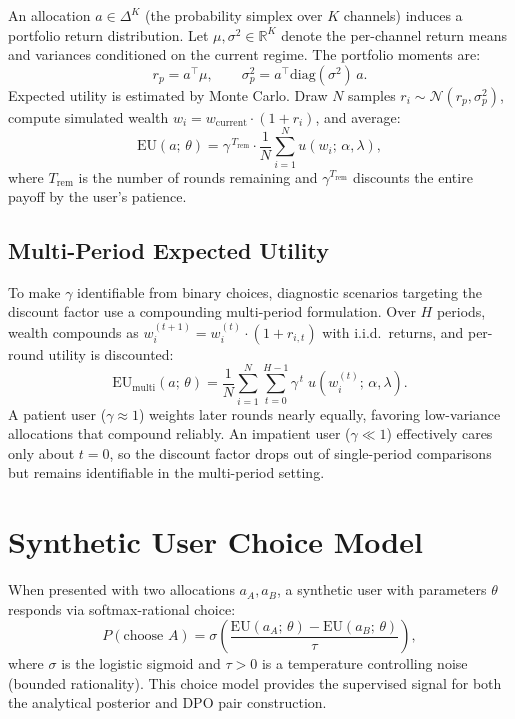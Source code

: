 \documentclass[11pt]{article}
\begin{document}
An allocation $a \in \Delta^K$ (the probability simplex over $K$ channels)
induces a portfolio return distribution. Let $\mu, \sigma^2 \in \mathbb{R}^K$
denote the per-channel return means and variances conditioned on the current
regime. The portfolio moments are:
\begin{equation}\label{eq:portfolio}
  r_p = a^\top \mu, \qquad
  \sigma_p^2 = a^\top \mathrm{diag}(\sigma^2)\, a.
\end{equation}
Expected utility is estimated by Monte Carlo. Draw $N$ samples
$r_i \sim \mathcal{N}(r_p, \sigma_p^2)$, compute simulated wealth
$w_i = w_{\mathrm{current}} \cdot (1 + r_i)$, and average:
\begin{equation}\label{eq:eu-single}
  \mathrm{EU}(a;\, \theta)
  = \gamma^{\,T_{\mathrm{rem}}} \cdot
    \frac{1}{N}\sum_{i=1}^{N} u(w_i;\, \alpha, \lambda),
\end{equation}
where $T_{\mathrm{rem}}$ is the number of rounds remaining and
$\gamma^{T_{\mathrm{rem}}}$ discounts the entire payoff by the user's
patience.

\subsection{Multi-Period Expected Utility}

To make $\gamma$ identifiable from binary choices, diagnostic scenarios
targeting the discount factor use a compounding multi-period formulation.
Over $H$ periods, wealth compounds as
$w_i^{(t+1)} = w_i^{(t)} \cdot (1 + r_{i,t})$ with i.i.d.\ returns, and
per-round utility is discounted:
\begin{equation}\label{eq:eu-multi}
  \mathrm{EU}_{\mathrm{multi}}(a;\, \theta)
  = \frac{1}{N}\sum_{i=1}^{N} \sum_{t=0}^{H-1}
    \gamma^{\,t}\; u\!\left(w_i^{(t)};\, \alpha, \lambda\right).
\end{equation}
A patient user ($\gamma \approx 1$) weights later rounds nearly equally,
favoring low-variance allocations that compound reliably. An impatient user
($\gamma \ll 1$) effectively cares only about $t = 0$, so the discount
factor drops out of single-period comparisons but remains identifiable in the
multi-period setting.


\section{Synthetic User Choice Model}

When presented with two allocations $a_A, a_B$, a synthetic user with
parameters $\theta$ responds via softmax-rational choice:
\begin{equation}\label{eq:choice}
  P(\text{choose } A)
  = \sigma\!\left(\frac{\mathrm{EU}(a_A;\,\theta)
                       - \mathrm{EU}(a_B;\,\theta)}{\tau}\right),
\end{equation}
where $\sigma$ is the logistic sigmoid and $\tau > 0$ is a temperature
controlling noise (bounded rationality). This choice model provides the
supervised signal for both the analytical posterior and DPO pair construction.
\end{document}

